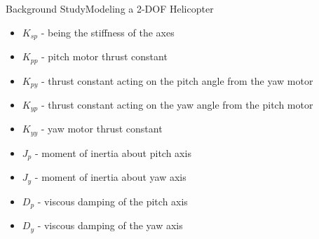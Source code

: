 \documentclass{beamer}
\begin{document}
\begin{frame}{Background Study}{Modeling a 2-DOF Helicopter}
\begin{itemize}
    \item $K_{sp}$ - being the stiffness of the axes
    \item $K_{pp}$ - pitch motor thrust constant
    \item $K_{py}$ - thrust constant acting on the pitch angle from the yaw motor
    \item $K_{yp}$ - thrust constant acting on the yaw angle from the pitch motor
    \item $K_{yy}$ - yaw motor thrust constant
    \item $J_p$ - moment of inertia about pitch axis
    \item $J_y$ - moment of inertia about yaw axis
    \item $D_p$ - viscous damping of the pitch axis
    \item $D_y$ - viscous damping of the yaw axis
\end{itemize}
\end{frame}

\end{document}
